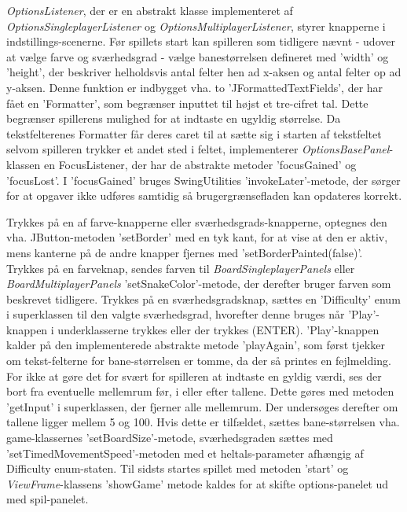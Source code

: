 \textit{OptionsListener}, der er en abstrakt klasse implementeret af \textit{OptionsSingleplayerListener} og \textit{OptionsMultiplayerListener}, styrer knapperne i indstillings-scenerne. Før spillets start kan spilleren som tidligere nævnt - udover at vælge farve og sværhedsgrad - vælge banestørrelsen defineret med 'width' og 'height', der beskriver helholdsvis antal felter hen ad x-aksen og antal felter op ad y-aksen. Denne funktion er indbygget vha. to 'JFormattedTextFields', der har fået en 'Formatter', som begrænser inputtet til højst et tre-cifret tal. Dette begrænser spillerens mulighed for at indtaste en ugyldig størrelse. Da tekstfelterenes Formatter får deres caret til at sætte sig i starten af tekstfeltet selvom spilleren trykker et andet sted i feltet, implementerer \textit{OptionsBasePanel}-klassen en FocusListener, der har de abstrakte metoder 'focusGained' og 'focusLost'. I 'focusGained' bruges SwingUtilities 'invokeLater'-metode, der sørger for at opgaver ikke udføres samtidig så brugergrænsefladen kan opdateres korrekt.


Trykkes på en af farve-knapperne eller sværhedsgrads-knapperne, optegnes den vha. JButton-metoden 'setBorder' med en tyk kant, for at vise at den er aktiv, mens kanterne på de andre knapper fjernes med 'setBorderPainted(false)'. Trykkes på en farveknap, sendes farven til \textit{BoardSingleplayerPanels} eller \textit{BoardMultiplayerPanels} 'setSnakeColor'-metode, der derefter bruger farven som beskrevet tidligere. Trykkes på en sværhedsgradsknap, sættes  en 'Difficulty' enum i superklassen til den valgte sværhedsgrad, hvorefter denne bruges når 'Play'-knappen i underklasserne trykkes eller der trykkes (ENTER). 'Play'-knappen kalder på den implementerede abstrakte metode 'playAgain', som først tjekker om tekst-felterne for bane-størrelsen er tomme, da der så printes en fejlmelding. For ikke at gøre det for svært for spilleren at indtaste en gyldig værdi, ses der bort fra eventuelle mellemrum før, i eller efter tallene. Dette gøres med metoden 'getInput' i superklassen, der fjerner alle mellemrum. Der undersøges derefter om tallene ligger mellem 5 og 100. Hvis dette er tilfældet, sættes bane-størrelsen vha. game-klassernes 'setBoardSize'-metode, sværhedsgraden sættes med 'setTimedMovementSpeed'-metoden med et heltals-parameter afhængig af Difficulty enum-staten. Til sidsts startes spillet med metoden 'start' og \textit{ViewFrame}-klassens 'showGame' metode kaldes for at skifte options-panelet ud med spil-panelet.